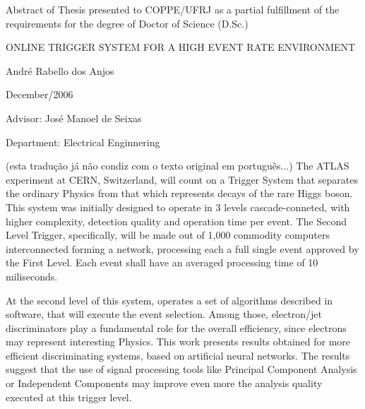 \clearpage

\noindent
Abstract of Thesis presented to COPPE/UFRJ as a partial fulfillment of the
\linebreak requirements for the degree of Doctor of Science (D.Sc.)

\vspace{1.5cm}

\begin{center}
ONLINE TRIGGER SYSTEM FOR A HIGH EVENT RATE ENVIRONMENT 
\vspace{1cm}

André Rabello dos Anjos
\vspace{1cm}

December/2006
\end{center}
\vspace{2cm}

\noindent
Advisor: José Manoel de Seixas
\vspace{2cm}

\noindent
Department: Electrical Enginnering
\vspace{2cm}

\begin{summary}{1.2}
\hspace{0.8cm}(esta tradução já não condiz com o texto original em português...)
The ATLAS experiment at CERN, Switzerland, will count on a Trigger System that
separates the ordinary Physics from that which represents decays of the rare
Higgs boson. This system was initially designed to operate in 3 levels
cascade-conneted, with higher complexity, detection quality and operation time
per event. The Second Level Trigger, specifically, will be made out of 1,000
commodity computers interconnected forming a network, processing each a full
single event approved by the First Level. Each event shall have an averaged
processing time of 10 miliseconds.

At the second level of this system, operates a set of algorithms described in
software, that will execute the event selection. Among those, electron/jet
discriminators play a fundamental role for the overall efficiency, since
electrons may represent interesting Physics. This work presents results
obtained for more efficient discriminating systems, based on artificial neural
networks. The results suggest that the use of signal processing tools like
Principal Component Analysis or Independent Components may improve even more
the analysis quality executed at this trigger level.
\end{summary}
